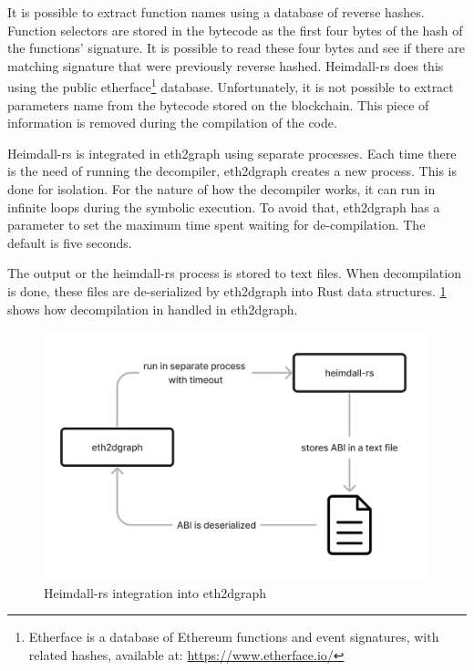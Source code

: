 It is possible to extract function names using a database of reverse hashes. Function selectors are stored in the bytecode as the first four bytes of the hash of the functions' signature. It is possible to read these four bytes and see if there are matching signature that were previously reverse hashed. Heimdall-rs does this using the public etherface\footnote{Etherface is a database of Ethereum functions and event signatures, with related hashes, available at: \url{https://www.etherface.io/}} database. 
Unfortunately, it is not possible to extract parameters name from the bytecode stored on the blockchain. This piece of information is removed during the compilation of the code. 

Heimdall-rs is integrated in eth2graph using separate processes. Each time there is the need of running the decompiler, eth2dgraph creates a new process. This is done for isolation. For the nature of how the decompiler works, it can run in infinite loops during the symbolic execution. To avoid that, eth2dgraph has a parameter to set the maximum time spent waiting for de-compilation. The default is  five seconds.

The output or the heimdall-rs process is stored to text files. When decompilation is done, these files are de-serialized by eth2dgraph into Rust data structures. \cref{fig:decompilation-architecture} shows how decompilation in handled in eth2dgraph.

\begin{figure}[H]
  \centering
  \includegraphics[width=1\textwidth]{Figures/methods/decompilation-architecture.jpg}
  \caption[Heimdall-rs integration into eth2dgraph]{Heimdall-rs integration into eth2dgraph}
  \label{fig:decompilation-architecture}
\end{figure}

